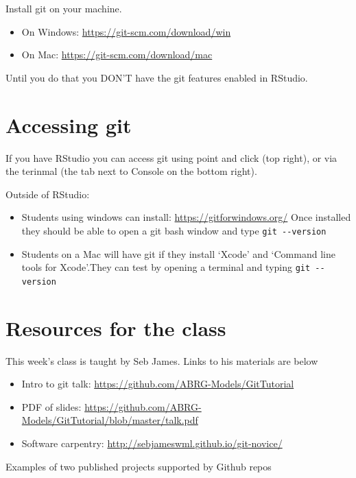 \documentclass[
  12pt,
  a5paper,
]{book}
\providecommand{\tightlist}{%
  \setlength{\itemsep}{0pt}\setlength{\parskip}{0pt}}
\begin{document}
Install git on your machine.

\begin{itemize}
\tightlist
\item
  On Windows: \url{https://git-scm.com/download/win}
\item
  On Mac: \url{https://git-scm.com/download/mac}
\end{itemize}

Until you do that you DON'T have the git features enabled in RStudio.

\hypertarget{accessing-git}{%
\section{Accessing git}\label{accessing-git}}

If you have RStudio you can access git using point and click (top right), or via the terinmal (the tab next to Console on the bottom right).

Outside of RStudio:

\begin{itemize}
\tightlist
\item
  Students using windows can install: \url{https://gitforwindows.org/} Once installed they should be able to open a git bash window and type \texttt{git\ -\/-version}
\item
  Students on a Mac will have git if they install `Xcode' and `Command line tools for Xcode'.They can test by opening a terminal and typing \texttt{git\ -\/-version}
\end{itemize}

\hypertarget{resources-for-the-class}{%
\section{Resources for the class}\label{resources-for-the-class}}

This week's class is taught by Seb James. Links to his materials are below

\begin{itemize}
\tightlist
\item
  Intro to git talk: \url{https://github.com/ABRG-Models/GitTutorial}
\item
  PDF of slides: \url{https://github.com/ABRG-Models/GitTutorial/blob/master/talk.pdf}
\item
  Software carpentry: \url{http://sebjameswml.github.io/git-novice/}
\end{itemize}

Examples of two published projects supported by Github repos
\end{document}
